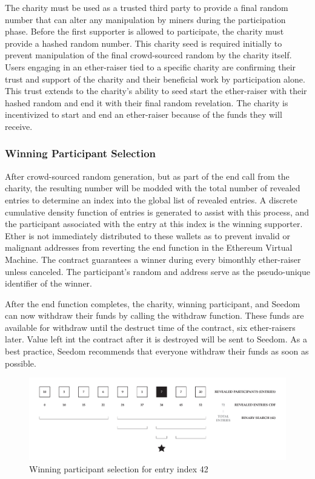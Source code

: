 \documentclass[11pt]{article}
\begin{document}
The charity must be used as a trusted third party to provide a final random number that can alter any manipulation by miners during the participation phase. Before the first supporter is allowed to participate, the charity must provide a hashed random number. This charity seed is required initially to prevent manipulation of the final crowd-sourced random by the charity itself. Users engaging in an ether-raiser tied to a specific charity are confirming their trust and support of the charity and their beneficial work by participation alone. This trust extends to the charity's ability to seed start the ether-raiser with their hashed random and end it with their final random revelation. The charity is incentivized to start and end an ether-raiser because of the funds they will receive.

\subsubsection{Winning Participant Selection}

After crowd-sourced random generation, but as part of the end call from the charity, the resulting number will be modded with the total number of revealed entries to determine an index into the global list of revealed entries. A discrete cumulative density function of entries is generated to assist with this process, and the participant associated with the entry at this index is the winning supporter. Ether is not immediately distributed to these wallets as to prevent invalid or malignant addresses from reverting the end function in the Ethereum Virtual Machine. The contract guarantees a winner during every bimonthly ether-raiser unless canceled. The participant's random and address serve as the pseudo-unique identifier of the winner.

After the end function completes, the charity, winning participant, and Seedom can now withdraw their funds by calling the withdraw function. These funds are available for withdraw until the destruct time of the contract, six ether-raisers later. Value left int the contract after it is destroyed will be sent to Seedom. As a best practice, Seedom recommends that everyone withdraw their funds as soon as possible.

\begin{figure}[H]
\begin{center}
\includegraphics[width=1.0\textwidth]{./graphics/winningParticipantSelection.pdf}
\caption{Winning participant selection for entry index 42}
\label{figure:winningParticipantSelection}
\end{center}
\end{figure}
\end{document}
